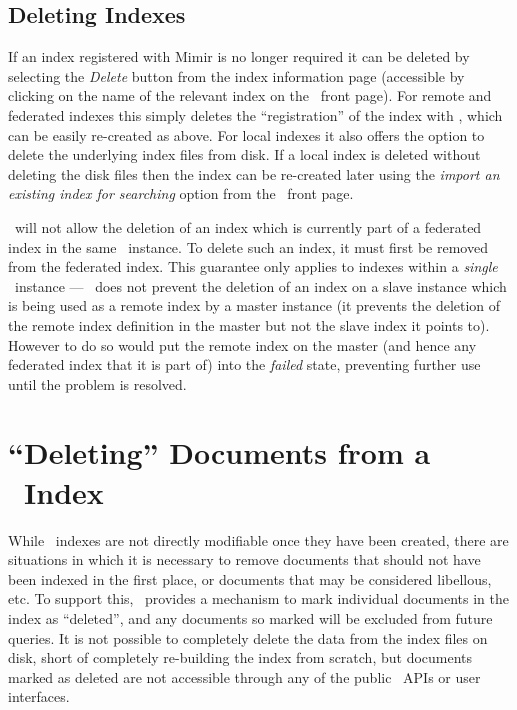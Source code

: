\subsection{Deleting Indexes}

If an index registered with Mimir is no longer required it can be deleted by
selecting the {\em Delete} button from the index information page (accessible by
clicking on the name of the relevant index on the \Mimir\ front page).  For
remote and federated indexes this simply deletes the ``registration'' of the
index with \Mimir, which can be easily re-created as above.  For local indexes
it also offers the option to delete the underlying index files from disk.  If a
local index is deleted without deleting the disk files then the index can be
re-created later using the {\em import an existing index for searching} option
from the \Mimir\ front page.

\Mimir\ will not allow the deletion of an index which is currently part of a
federated index in the same \Mimir\ instance.  To delete such an index, it must
first be removed from the federated index.  This guarantee only applies to
indexes within a {\em single} \Mimir\ instance --- \Mimir\ does not prevent the
deletion of an index on a slave instance which is being used as a remote index
by a master instance (it prevents the deletion of the remote index definition
in the master but not the slave index it points to).  However to do so would
put the remote index on the master (and hence any federated index that it is
part of) into the {\em failed} state, preventing further use until the problem
is resolved.

\section{``Deleting'' Documents from a \Mimir\ Index}\label{sec:admin:takedown}

While \Mimir\ indexes are not directly modifiable once they have been created,
there are situations in which it is necessary to remove documents that should
not have been indexed in the first place, or documents that may be considered
libellous, etc.  To support this, \Mimir\ provides a mechanism to mark
individual documents in the index as ``deleted'', and any documents so marked
will be excluded from future queries.  It is not possible to completely delete
the data from the index files on disk, short of completely re-building the
index from scratch, but documents marked as deleted are not accessible through
any of the public \Mimir\ APIs or user interfaces.

